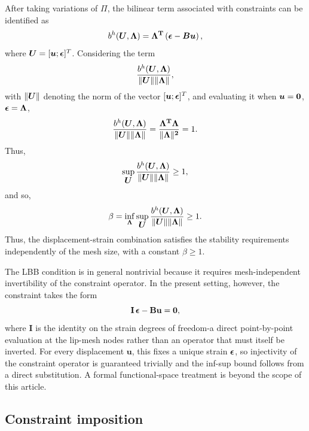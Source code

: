 \documentclass[10pt]{cas-sc}
\newenvironment{addedblock}{}{}
\begin{document}
\begin{addedblock}
After taking variations of $\Pi$, the bilinear term associated with constraints can be identified as
\begin{equation}
	b^h(\mbox{\boldmath $U$},\bf \Lambda) = \bf \Lambda ^T \left(\mbox{\boldmath $\epsilon$} - \mbox{\boldmath $B$} \mbox{\boldmath $u$} \right),
\end{equation}
where $\mbox{\boldmath $U$} = [\mbox{\boldmath $u$} ; \mbox{\boldmath $\epsilon$} ]^T$. Considering the term 
\[    \frac{ b^h(\mbox{\boldmath $U$},\bf \Lambda)}{\|\mbox{\boldmath $U$} \| \| \bf \Lambda\|} , \]
with $ \|\mbox{\boldmath $U$} \|$ denoting the norm of the vector $[\mbox{\boldmath $u$} ; \mbox{\boldmath $\epsilon$} ]^T$, and evaluating it when $\mbox{\boldmath $u$} = \bf 0$, $\mbox{\boldmath $\epsilon$} = \bf \Lambda$,
\begin{equation}
	\frac{ b^h(\mbox{\boldmath $U$},\bf \Lambda)}{\|\mbox{\boldmath $U$} \| \| \bf \Lambda\|} =  \frac{\bf \Lambda ^T \bf \Lambda }{\| \bf \Lambda\|^2} = 1.
\end{equation}
Thus,
\begin{equation}
	\sup _{\mbox{\boldmath $U$}} \frac{ b^h(\mbox{\boldmath $U$},\bf \Lambda)}{\|\mbox{\boldmath $U$} \| \| \bf \Lambda\|}  \geq 1,
\end{equation}
and so,
\begin{equation}
	\beta = \inf_{\bf \Lambda} \sup _{\mbox{\boldmath $U$}} 	\frac{ b^h(\mbox{\boldmath $U$},\bf \Lambda)}{\|\mbox{\boldmath $U$} \| \| \bf \Lambda\|}  \geq 1.
\end{equation}
Thus, the displacement-strain combination satisfies the stability requirements independently of the mesh size, with a constant $\beta \geq 1$. 

The LBB condition is in general nontrivial because it requires mesh-independent invertibility of the constraint operator. In the present setting, however, the constraint takes the form
\begin{equation*}
	\mathbf{I}\,\mbox{\boldmath $\epsilon$} - \mathbf{B}\mathbf{u} = \mathbf{0},
\end{equation*}
where $\mathbf{I}$ is the identity on the strain degrees of freedom-a direct point-by-point evaluation at the lip-mesh nodes rather than an operator that must itself be inverted. For every displacement $\mathbf{u}$, this fixes a unique strain $\mbox{\boldmath $\epsilon$}$, so injectivity of the constraint operator is guaranteed trivially and the inf-sup bound follows from a direct substitution. A formal functional-space treatment is beyond the scope of this article.

\end{addedblock}
\subsection{Constraint imposition}
\end{document}
